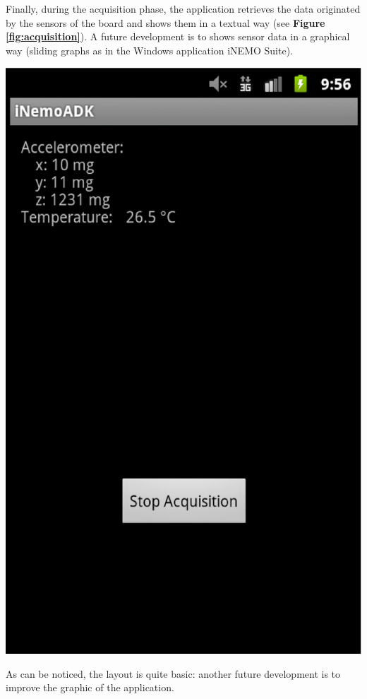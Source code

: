 Finally, during the acquisition phase, the application retrieves the data originated by the sensors of the board and shows them in a textual way (see {\bf Figure \ref{fig:acquisition}}). A future development is to shows sensor data in a graphical way (sliding graphs as in the Windows application iNEMO Suite).

\begin{center}
	\includegraphics[width=0.6\linewidth]{pics/acquisition.eps}
	\label{fig:acquisition}
\end{center}

As can be noticed, the layout is quite basic: another future development is to improve the graphic of the application.


